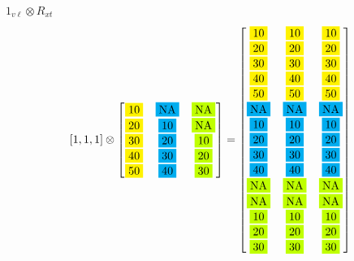 \documentclass[english]{beamer}
\begin{document}
\begin{frame}{\(1_{v\ell} \otimes R_{xt}\)}
\footnotesize
\[
[1,1,1] \otimes
\begin{bmatrix}
\fcolorbox{white}{yellow}{10} & \fcolorbox{white}{cyan}{NA} & \fcolorbox{white}{lime}{NA} \\
\fcolorbox{white}{yellow}{20} & \fcolorbox{white}{cyan}{10} & \fcolorbox{white}{lime}{NA} \\
\fcolorbox{white}{yellow}{30} & \fcolorbox{white}{cyan}{20} & \fcolorbox{white}{lime}{10} \\
\fcolorbox{white}{yellow}{40} & \fcolorbox{white}{cyan}{30} & \fcolorbox{white}{lime}{20} \\
\fcolorbox{white}{yellow}{50} & \fcolorbox{white}{cyan}{40} & \fcolorbox{white}{lime}{30} \\
\end{bmatrix} 
=
\begin{bmatrix} 
\fcolorbox{white}{yellow}{10} & \fcolorbox{white}{yellow}{10} & \fcolorbox{white}{yellow}{10} \\ 
\fcolorbox{white}{yellow}{20} & \fcolorbox{white}{yellow}{20} & \fcolorbox{white}{yellow}{20} \\ 
\fcolorbox{white}{yellow}{30} & \fcolorbox{white}{yellow}{30} & \fcolorbox{white}{yellow}{30} \\ 
\fcolorbox{white}{yellow}{40} & \fcolorbox{white}{yellow}{40} & \fcolorbox{white}{yellow}{40} \\ 
\fcolorbox{white}{yellow}{50} & \fcolorbox{white}{yellow}{50} & \fcolorbox{white}{yellow}{50} \\ 
\fcolorbox{white}{cyan}{NA} & \fcolorbox{white}{cyan}{NA} & \fcolorbox{white}{cyan}{NA} \\
\fcolorbox{white}{cyan}{10} & \fcolorbox{white}{cyan}{10} & \fcolorbox{white}{cyan}{10} \\
\fcolorbox{white}{cyan}{20} & \fcolorbox{white}{cyan}{20} & \fcolorbox{white}{cyan}{20} \\
\fcolorbox{white}{cyan}{30} & \fcolorbox{white}{cyan}{30} & \fcolorbox{white}{cyan}{30} \\
\fcolorbox{white}{cyan}{40} & \fcolorbox{white}{cyan}{40} & \fcolorbox{white}{cyan}{40} \\ 
\fcolorbox{white}{lime}{NA} & \fcolorbox{white}{lime}{NA} & \fcolorbox{white}{lime}{NA} \\
\fcolorbox{white}{lime}{NA} & \fcolorbox{white}{lime}{NA} & \fcolorbox{white}{lime}{NA} \\
\fcolorbox{white}{lime}{10} & \fcolorbox{white}{lime}{10} & \fcolorbox{white}{lime}{10} \\
\fcolorbox{white}{lime}{20} & \fcolorbox{white}{lime}{20} & \fcolorbox{white}{lime}{20} \\
\fcolorbox{white}{lime}{30} & \fcolorbox{white}{lime}{30} & \fcolorbox{white}{lime}{30} \\
\end{bmatrix}
\]
\end{frame}
\end{document}
